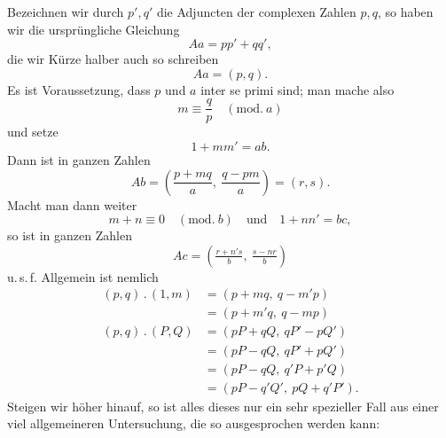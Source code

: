 Bezeichnen wir durch $p',q'$ die Adjuncten der complexen Zahlen $p,q$,
so haben wir die ursprüngliche Gleichung
\[
Aa=pp'+qq',
\]
\noindent die wir Kürze halber auch so schreiben
\[
Aa=(p,q).
\]
\noindent Es ist Voraussetzung, dass $p$ und $a$ inter se primi sind; man mache also
\[
m\equiv\frac{q}{p}\quad(\mathrm{mod.}\ a)
\]
\noindent und setze
\[
1+mm'=ab.
\]
\noindent Dann ist in ganzen Zahlen
\[
Ab=\left(\frac{p+mq}{a},\ \frac{q-pm}{a}\right)=(r,s).
\]
\noindent Macht man dann weiter
\[
m+n\equiv0\quad(\mathrm{mod.}\ b)\quad\text{und}\quad1+nn'=bc,
\]
\noindent so ist in ganzen Zahlen
\[
Ac=\left(\tfrac{r+n's}{b},\ \tfrac{s-nr}{b}\right)
\]
\noindent u.\,s.\,f.
\clearpage
{}
\noindent\hspace*{\parindent}Allgemein ist nemlich
\[
\begin{aligned}
(p,q)\mathbin{.}(1,m)&=(p+mq,\ q-m'p)\\
&=(p+m'q,\ q-mp)\\
(p,q)\mathbin{.}(P,Q)&=(pP+qQ,\ qP'-pQ')\\
&=(pP-qQ,\ qP'+pQ')\\
&=(pP-qQ,\ q'P+p'Q)\\
&=(pP-q'Q',\ pQ+q'P').
\end{aligned}
\]
\noindent\hspace*{\parindent}Steigen wir höher hinauf, so ist alles dieses nur ein sehr spezieller Fall
aus einer viel allgemeineren Untersuchung, die so ausgesprochen werden kann:

